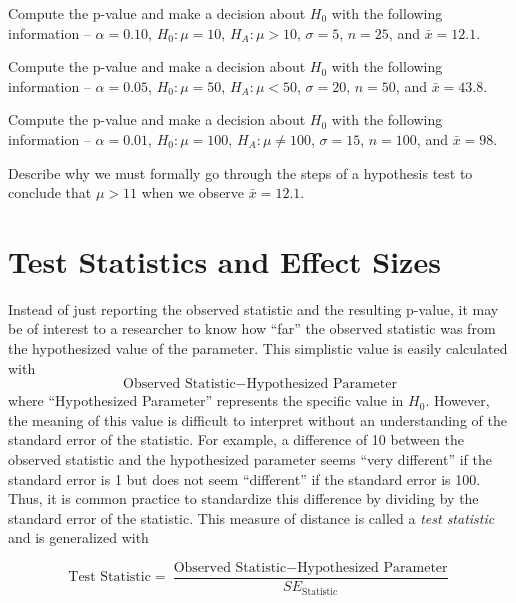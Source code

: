 \documentclass[10pt,openany]{book}\usepackage[]{graphicx}\usepackage[]{color}
\begin{document}
\begin{exsection}
  \item \label{revex:HypTCalc1} Compute the p-value and make a decision about $H_{0}$ with the following information -- $\alpha=0.10$, $H_{0}:\mu=10$, $H_{A}:\mu>10$, $\sigma=5$, $n=25$, and $\bar{x}=12.1$. 
  \item \label{revex:HypTCalc2} Compute the p-value and make a decision about $H_{0}$ with the following information -- $\alpha=0.05$, $H_{0}:\mu=50$, $H_{A}:\mu<50$, $\sigma=20$, $n=50$, and $\bar{x}=43.8$. 
  \item \label{revex:HypTCalc3}  Compute the p-value and make a decision about $H_{0}$ with the following information -- $\alpha=0.01$, $H_{0}:\mu=100$, $H_{A}:\mu\neq100$, $\sigma=15$, $n=100$, and $\bar{x}=98$. 
  \item \label{revex:HypTWhy} Describe why we must formally go through the steps of a hypothesis test to conclude that $\mu>11$ when we observe $\bar{x}=12.1$. 
\end{exsection}


\section{Test Statistics and Effect Sizes}
Instead of just reporting the observed statistic and the resulting p-value, it may be of interest to a researcher to know how ``far'' the observed statistic was from the hypothesized value of the parameter.  This simplistic value is easily calculated with
\[ \text{Observed Statistic}-\text{Hypothesized Parameter} \]
where ``Hypothesized Parameter'' represents the specific value in $H_{0}$.  However, the meaning of this value is difficult to interpret without an understanding of the standard error of the statistic.  For example, a difference of 10 between the observed statistic and the hypothesized parameter seems ``very different'' if the standard error is 1 but does not seem ``different'' if the standard error is 100.  Thus, it is common practice to standardize this difference by dividing by the standard error of the statistic.  This measure of distance is called a \emph{test statistic} and is generalized with

\begin{equation}  \label{eqn:zTestStatGeneral}
  \text{Test Statistic} = \frac{\text{Observed Statistic}-\text{Hypothesized Parameter}}{SE_{\text{Statistic}}}
\end{equation}
\end{document}
